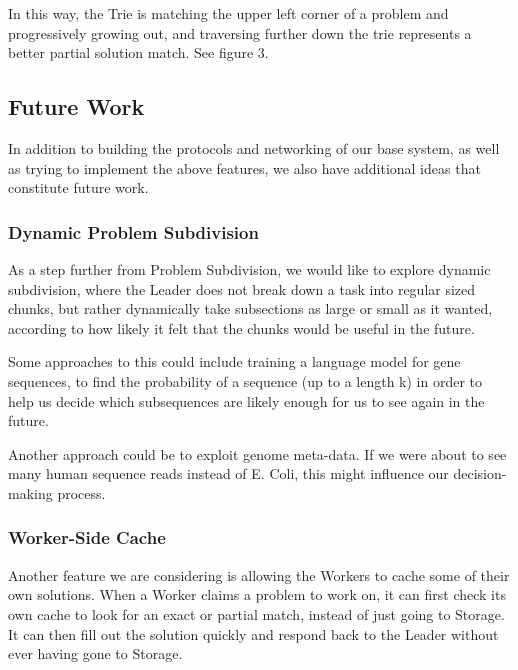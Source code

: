 \documentclass[12pt]{article}
\begin{document}
In this way, the Trie is matching the upper left corner of a problem and progressively growing out, and traversing further down the trie represents a better partial solution match. See figure 3.




\subsection{Future Work}
In addition to building the protocols and networking of our base system, as well as trying to implement the above features, we also have additional ideas that constitute future work.

\subsubsection{Dynamic Problem Subdivision}
As a step further from Problem Subdivision, we would like to explore dynamic subdivision, where the Leader does not break down a task into regular sized chunks, but rather dynamically take subsections as large or small as it wanted, according to how likely it felt that the chunks would be useful in the future.

Some approaches to this could include training a language model for gene sequences, to find the probability of a sequence (up to a length k) in order to help us decide which subsequences are likely enough for us to see again in the future.

Another approach could be to exploit genome meta-data. If we were about to see many human sequence reads instead of E. Coli, this might influence our decision-making process.




\subsubsection{Worker-Side Cache}

Another feature we are considering is allowing the Workers to cache some of their own solutions. When a Worker claims a problem to work on, it can first check its own cache to look for an exact or partial match, instead of just going to Storage. It can then fill out the solution quickly and respond back to the Leader without ever having gone to Storage. 
\end{document}
